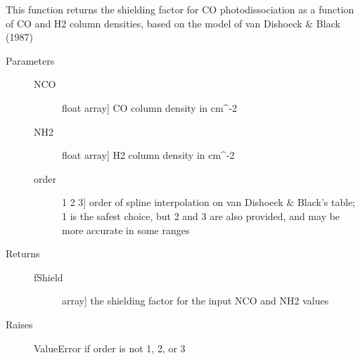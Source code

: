 \documentclass[letterpaper,10pt,english]{sphinxmanual}
\begin{document}
\begin{fulllineitems}
\label{fulldoc:despotic.chemistry.shielding.fShield_CO_vDB}
This function returns the shielding factor for CO
photodissociation as a function of CO and H2 column densities,
based on the model of van Dishoeck \& Black (1987)
\begin{description}
\item[{Parameters}] \leavevmode\begin{description}
\item[{NCO}] \leavevmode{[}float \textbar{} array{]}
CO column density in cm\textasciicircum{}-2

\item[{NH2}] \leavevmode{[}float \textbar{} array{]}
H2 column density in cm\textasciicircum{}-2

\item[{order}] \leavevmode{[}1 \textbar{} 2 \textbar{} 3{]}
order of spline interpolation on van Dishoeck \& Black's table;
1 is the safest choice, but 2 and 3 are also provided, and may
be more accurate in some ranges

\end{description}

\item[{Returns}] \leavevmode\begin{description}
\item[{fShield}] \leavevmode{[}array{]}
the shielding factor for the input NCO and NH2 values

\end{description}

\item[{Raises}] \leavevmode
ValueError if order is not 1, 2, or 3

\end{description}

\end{fulllineitems}
\end{document}

